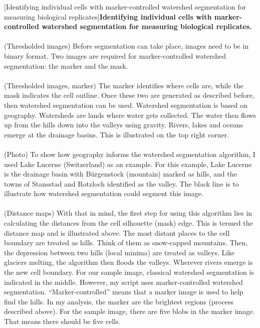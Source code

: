\begin{centering}
[Identifying individual cells with marker-controlled watershed segmentation for measuring biological replicates]{\textbf{Identifying individual cells with marker-controlled watershed segmentation for measuring biological replicates.}
\\
\\
(Thresholded images) Before segmentation can take place, images need to be in binary format. Two images are required for marker-controlled watershed segmentation: the marker and the mask.
\\
\\
(Thresholded images, marker) The marker identifies where cells are, while the mask indicates the cell outline. Once these two are generated as described before, then watershed segmentation can be used. Watershed segmentation is based on geography. Watersheds are lands where water gets collected. The water then flows up from the hills down into the valleys using gravity. Rivers, lakes and oceans emerge at the drainage basins. This is illustrated on the top right corner.
\\
\\
(Photo) To show how geography informs the watershed segmentation algorithm, I used Lake Lucerne (Switzerland) as an example. For this example, Lake Lucerne is the drainage basin with Bürgenstock (mountain) marked as hills, and the towns of Stansstad and Rotzloch identified as the valley. The black line is to illustrate how watershed segmentation could segment this image.
\\
\\
(Distance maps) With that in mind, the first step for using this algorithm lies in calculating the distances from the cell silhouette (mask) edge. This is termed the distance map and is illustrated above. The most distant places to the cell boundary are treated as hills. Think of them as snow-capped mountains. Then, the depression between two hills (local minima) are treated as valleys. Like glaciers melting, the algorithm then floods the valleys. Wherever rivers emerge is the new cell boundary. For our sample image, classical watershed segmentation is indicated in the middle. However, my script uses marker-controlled watershed segmentation. “Marker-controlled” means that a marker image is used to help find the hills. In my analysis, the marker are the brightest regions (process described above). For the sample image, there are five blobs in the marker image. That means there should be five cells.
}
\end{centering}
